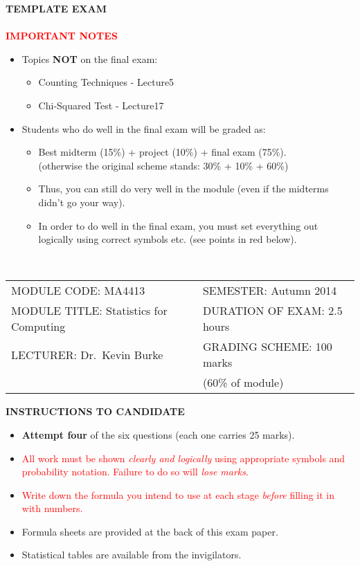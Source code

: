 \documentclass[12pt]{article}
\newcommand{\tcr}{\textcolor{red}}
\begin{document}
\begin{center}
{\bf\Huge TEMPLATE EXAM\\[0.5cm]}
\quad\\[1cm]
\tcr{{\bf\large IMPORTANT NOTES\\[0.0cm]}}
\begin{itemize}
\item Topics {\bf NOT} on the final exam:
\begin{itemize}
\item Counting Techniques - Lecture5
\item Chi-Squared Test - Lecture17
\end{itemize}
\item Students who do well in the final exam will be graded as:
\begin{itemize}
\item Best midterm (15\%) + project (10\%) + final exam (75\%).\\
{\footnotesize(otherwise the original scheme stands: 30\% + 10\% + 60\%)}
\item Thus, you can still do very well in the module (even if the midterms didn't go your way).
\item In order to do well in the final exam, you must set everything out logically using correct symbols etc. (see points in red below).
\end{itemize}
\end{itemize}
\quad\\[1cm]
\begin{adjustwidth}{-1cm}{0cm}
\begin{tabular}{l@{\qquad}l}
MODULE CODE: MA4413&SEMESTER: Autumn 2014\\[1cm]
MODULE TITLE: Statistics for Computing& DURATION OF EXAM: 2.5 hours\\[1cm]
LECTURER: Dr.~Kevin Burke& GRADING SCHEME: 100 marks \\
& \hspace{3cm} (60\% of module)\\[2cm]
\end{tabular}
\end{adjustwidth}
{\bf INSTRUCTIONS TO CANDIDATE}
\end{center}
\begin{small}
\begin{itemize}\itemsep0.3cm
\item {\bf Attempt four} of the six questions (each one carries 25 marks).
\item \tcr{All work must be shown \emph{clearly and logically} using appropriate symbols and probability notation. Failure to do so will \emph{lose marks}.}
\item \tcr{Write down the formula you intend to use at each stage \emph{before} filling it in with numbers.}
\item Formula sheets are provided at the back of this exam paper.
\item Statistical tables are available from the invigilators.
\end{itemize}
\end{small}
\newpage
\end{document}

